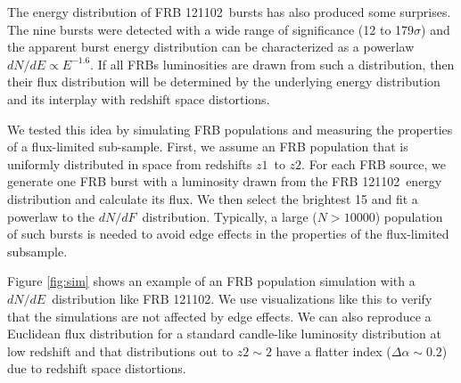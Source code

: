\documentclass[twocolumn]{aastex61}
\newcommand{\frb}{FRB 121102}
\begin{document}
The energy distribution of \frb\ bursts has also produced some surprises. The nine bursts were detected with a wide range of significance (12 to 179$\sigma$) and the apparent burst energy distribution can be characterized as a powerlaw $dN/dE\propto E^{-1.6}$. If all FRBs luminosities are drawn from such a distribution, then their flux distribution will be determined by the underlying energy distribution and its interplay with redshift space distortions.

We tested this idea by simulating FRB populations and measuring the properties of a flux-limited sub-sample. First, we assume an FRB population that is uniformly distributed in space from redshifts $z1$\ to $z2$. For each FRB source, we generate one FRB burst with a luminosity drawn from the \frb\ energy distribution and calculate its flux. We then select the brightest 15 \citep[equal to the current sample size used in modeling;][]{2016ApJ...830...75V} and fit a powerlaw to the $dN/dF$\ distribution. Typically, a large ($N>10000$) population of such bursts is needed to avoid edge effects in the properties of the flux-limited subsample. 

Figure \ref{fig:sim} shows an example of an FRB population simulation with a $dN/dE$\ distribution like \frb. We use visualizations like this to verify that the simulations are not affected by edge effects. We can also reproduce a Euclidean flux distribution for a standard candle-like luminosity distribution at low redshift and that distributions out to $z2\sim2$ have a flatter index ($\Delta\alpha\sim0.2$) due to redshift space distortions.
\end{document}
